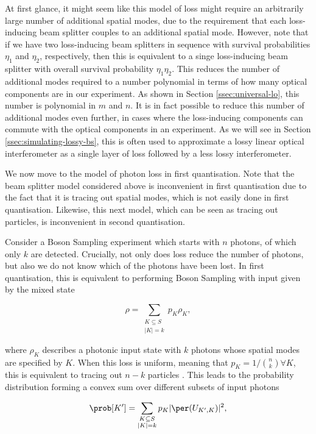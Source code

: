 At first glance, it might seem like this model of loss might require an arbitrarily large number of additional spatial modes, due to the requirement that each loss-inducing beam splitter couples to an additional spatial mode. However, note that if we have two loss-inducing beam splitters in sequence with survival probabilities $\eta_1$ and $\eta_2$, respectively, then this is equivalent to a singe loss-inducing beam splitter with overall survival probability $\eta_1\eta_2$. This reduces the number of additional modes required to a number polynomial in terms of how many optical components are in our experiment. As shown in Section \ref{ssec:universal-lo}, this number is polynomial in $m$ and $n$. It is in fact possible to reduce this number of additional modes even further, in cases where the loss-inducing components can commute with the optical components in an experiment. As we will see in Section \ref{ssec:simulating-lossy-bs}, this is often used to approximate a lossy linear optical interferometer as a single layer of loss followed by a less lossy interferometer.

We now move to the model of photon loss in first quantisation. Note that the beam splitter model considered above is inconvenient in first quantisation due to the fact that it is tracing out spatial modes, which is not easily done in first quantisation. Likewise, this next model, which can be seen as tracing out particles, is inconvenient in second quantisation.

Consider a Boson Sampling experiment which starts with $n$ photons, of which only $k$ are detected. Crucially, not only does loss reduce the number of photons, but also we do not know which of the photons have been lost. In first quantisation, this is equivalent to performing Boson Sampling with input given by the mixed state

\begin{equation}
\rho = \sum_{\substack{K \subseteq S\\|K| = k}}p_{K}\rho_K,
\end{equation}

\noindent where $\rho_K$ describes a photonic input state with $k$ photons whose spatial modes are specified by $K$. When this loss is uniform, meaning that $p_K=1/\binom{n}{k}\forall K$, this is equivalent to tracing out $n-k$ particles \cite{oszmaniec2018}. This leads to the probability distribution forming a convex sum over different subsets of input photons

\begin{equation}
\prob[K'] = \sum_{\substack{K \subseteq S\\|K| = k}}p_{K}|\per(U_{K',K})|^2,
\end{equation}

